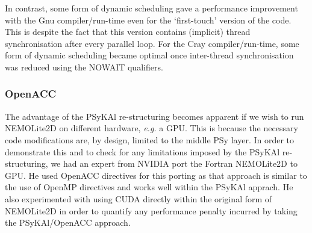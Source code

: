 \documentclass[gmd, manuscript]{copernicus}
\begin{document}
In contrast, some form of dynamic scheduling gave a performance
improvement with the Gnu compiler/run-time even for the `first-touch'
version of the code. This is despite the fact that this version
contains (implicit) thread synchronisation after every parallel loop.
For the Cray compiler/run-time, some form of dynamic scheduling became
optimal once inter-thread synchronisation was reduced using the NOWAIT
qualifiers.





\subsubsection{OpenACC}

The advantage of the {PS}y{KA}l re-structuring becomes apparent if we
wish to run NEMOLite2D on different hardware, \textit{e.g.} a
GPU. This is because the necessary code modifications are, by design,
limited to the middle PSy layer. In order to demonstrate this and to
check for any limitations imposed by the {PS}y{KA}l re-structuring, we
had an expert from NVIDIA port the Fortran NEMOLite2D to GPU. He
used OpenACC directives for this porting as that approach is similar
to the use of OpenMP directives and works well within the {PS}y{KA}l
apprach. He also experimented with using CUDA directly within the
original form of NEMOLite2D in order to quantify any performance
penalty incurred by taking the {PS}y{KA}l/OpenACC approach.
\end{document}
